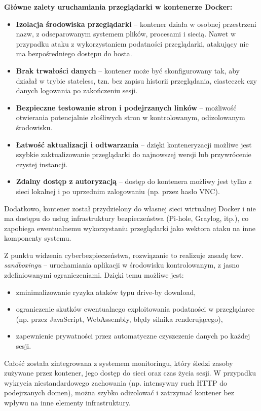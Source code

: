 \documentclass[
    left=2.5cm,         %
    right=2.5cm,        %
    top=2.5cm,          %
    bottom=3cm,         %
    bindingoffset=6mm,  %
    nohyphenation=true %
]{eiti/eiti-thesis} %
\begin{document}
\textbf{Główne zalety uruchamiania przeglądarki w kontenerze Docker:}
\begin{itemize}
    \item \textbf{Izolacja środowiska przeglądarki} – kontener działa w osobnej przestrzeni nazw, z odseparowanym systemem plików, procesami i siecią. Nawet w przypadku ataku z wykorzystaniem podatności przeglądarki, atakujący nie ma bezpośredniego dostępu do hosta.
    \item \textbf{Brak trwałości danych} – kontener może być skonfigurowany tak, aby działał w trybie stateless, tzn. bez zapisu historii przeglądania, ciasteczek czy danych logowania po zakończeniu sesji.
    \item \textbf{Bezpieczne testowanie stron i podejrzanych linków} – możliwość otwierania potencjalnie złośliwych stron w kontrolowanym, odizolowanym środowisku.
    \item \textbf{Łatwość aktualizacji i odtwarzania} – dzięki konteneryzacji możliwe jest szybkie zaktualizowanie przeglądarki do najnowszej wersji lub przywrócenie czystej instancji.
    \item \textbf{Zdalny dostęp z autoryzacją} – dostęp do kontenera możliwy jest tylko z sieci lokalnej i po uprzednim zalogowaniu (np. przez hasło VNC).
\end{itemize}

Dodatkowo, kontener został przydzielony do własnej sieci wirtualnej Docker i nie ma dostępu do usług infrastruktury bezpieczeństwa (Pi-hole, Graylog, itp.), co zapobiega ewentualnemu wykorzystaniu przeglądarki jako wektora ataku na inne komponenty systemu.

Z punktu widzenia cyberbezpieczeństwa, rozwiązanie to realizuje zasadę tzw. \textit{sandboxingu} – uruchamiania aplikacji w środowisku kontrolowanym, z jasno zdefiniowanymi ograniczeniami. Dzięki temu możliwe jest:
\begin{itemize}
    \item zminimalizowanie ryzyka ataków typu drive-by download,
    \item ograniczenie skutków ewentualnego exploitowania podatności w przeglądarce (np. przez JavaScript, WebAssembly, błędy silnika renderującego),
    \item zapewnienie prywatności przez automatyczne czyszczenie danych po każdej sesji.
\end{itemize}

Całość została zintegrowana z systemem monitoringu, który śledzi zasoby zużywane przez kontener, jego dostęp do sieci oraz czas życia sesji. W przypadku wykrycia niestandardowego zachowania (np. intensywny ruch HTTP do podejrzanych domen), można szybko odizolować i zatrzymać kontener bez wpływu na inne elementy infrastruktury.
\end{document}
